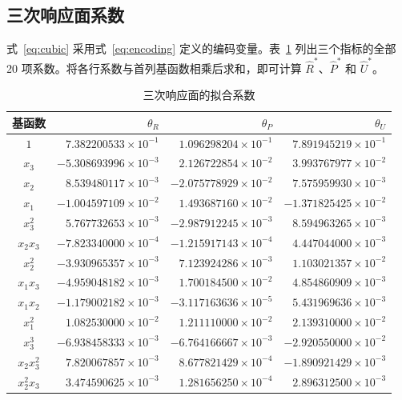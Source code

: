 \documentclass[withoutpreface,bwprint]{cumcmthesis}
\begin{document}
\subsection{三次响应面系数}
式~\eqref{eq:cubic} 采用式~\eqref{eq:encoding} 定义的编码变量。表~\ref{tab:cubic-coefficients} 列出三个指标的全部 20 项系数。将各行系数与首列基函数相乘后求和，即可计算 $\hat R^*$、$\hat P^*$ 和 $\hat U^*$。
\begin{table}[H]
\centering
\caption{三次响应面的拟合系数}
\label{tab:cubic-coefficients}
\scriptsize
\setlength{\tabcolsep}{7pt}
\renewcommand{\arraystretch}{1.04}
\begin{tabular}{crrr}
\toprule
基函数 & $\theta_R$ & $\theta_P$ & $\theta_U$\\
\midrule
$1$             & $ 7.382200533\times10^{-1}$ & $ 1.096298204\times10^{-1}$ & $ 7.891945219\times10^{-1}$\\
$x_3$           & $-5.308693996\times10^{-3}$ & $ 2.126722854\times10^{-2}$ & $ 3.993767977\times10^{-2}$\\
$x_2$           & $ 8.539480117\times10^{-3}$ & $-2.075778929\times10^{-2}$ & $ 7.575959930\times10^{-3}$\\
$x_1$           & $-1.004597109\times10^{-2}$ & $ 1.493687160\times10^{-2}$ & $-1.371825425\times10^{-2}$\\
$x_3^2$         & $ 5.767732653\times10^{-3}$ & $-2.987912245\times10^{-3}$ & $ 8.594963265\times10^{-3}$\\
$x_2x_3$        & $-7.823340000\times10^{-4}$ & $-1.215917143\times10^{-4}$ & $ 4.447044000\times10^{-3}$\\
$x_2^2$         & $-3.930965357\times10^{-3}$ & $ 7.123924286\times10^{-3}$ & $ 1.103021357\times10^{-2}$\\
$x_1x_3$        & $-4.959048182\times10^{-3}$ & $ 1.700184500\times10^{-2}$ & $ 4.854860909\times10^{-3}$\\
$x_1x_2$        & $-1.179002182\times10^{-3}$ & $-3.117163636\times10^{-5}$ & $ 5.431969636\times10^{-3}$\\
$x_1^2$         & $ 1.082530000\times10^{-2}$ & $ 1.211110000\times10^{-2}$ & $ 2.139310000\times10^{-2}$\\
$x_3^3$         & $-6.938458333\times10^{-3}$ & $-6.764166667\times10^{-3}$ & $-2.920550000\times10^{-2}$\\
$x_2x_3^2$      & $ 7.820067857\times10^{-3}$ & $ 8.677821429\times10^{-4}$ & $-1.890921429\times10^{-3}$\\
$x_2^2x_3$      & $ 3.474590625\times10^{-3}$ & $ 1.281656250\times10^{-4}$ & $ 2.896312500\times10^{-3}$\\

\end{tabular}
\end{table}
\end{document}
